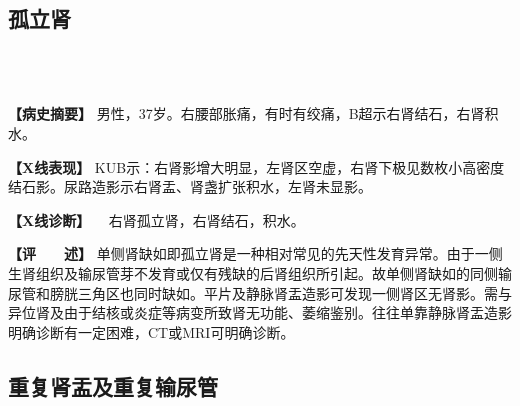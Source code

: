 \subsection{孤立肾}

\begin{figure}
    \centering
    \\
        \\
    \caption{}
    \label{fig6-2-6}
\end{figure}


\textbf{【病史摘要】}
男性，37岁。右腰部胀痛，有时有绞痛，B超示右肾结石，右肾积水。

\textbf{【X线表现】}
KUB示：右肾影增大明显，左肾区空虚，右肾下极见数枚小高密度结石影。尿路造影示右肾盂、肾盏扩张积水，左肾未显影。

\textbf{【X线诊断】} 　右肾孤立肾，右肾结石，积水。

\textbf{【评　　述】}
单侧肾缺如即孤立肾是一种相对常见的先天性发育异常。由于一侧生肾组织及输尿管芽不发育或仅有残缺的后肾组织所引起。故单侧肾缺如的同侧输尿管和膀胱三角区也同时缺如。平片及静脉肾盂造影可发现一侧肾区无肾影。需与异位肾及由于结核或炎症等病变所致肾无功能、萎缩鉴别。往往单靠静脉肾盂造影明确诊断有一定困难，CT或MRI可明确诊断。

\subsection{重复肾盂及重复输尿管}

\begin{figure}
    \centering
    \\
    \caption{}
    \label{fig6-2-7}
\end{figure}

